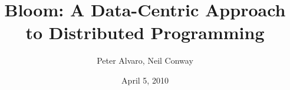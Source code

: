 \documentclass{article}
\begin{document}
\title{Bloom: A Data-Centric Approach to Distributed Programming}
\author{Peter Alvaro, Neil Conway}
\date{April 5, 2010}

\newcommand{\paa}[1]{{\textcolor{blue}{#1 -- paa}}}

\maketitle






\newpage


\end{document}
